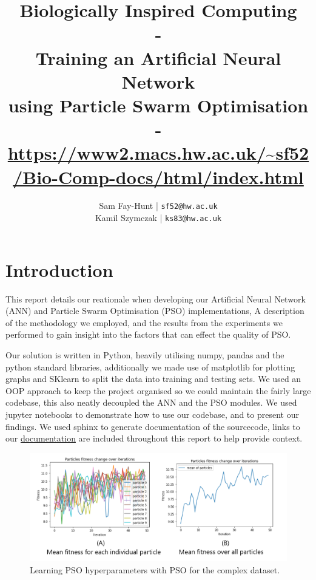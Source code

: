 \documentclass[11pt]{article}
\begin{document}
\title{%
	\bf Biologically Inspired Computing\\ 
    \large - \\
    Training an Artificial Neural Network\\
     using Particle Swarm Optimisation\\
     -\\
     \url{https://www2.macs.hw.ac.uk/~sf52/Bio-Comp-docs/html/index.html}}

\author{
	Sam Fay-Hunt | \texttt{sf52@hw.ac.uk}\\
	Kamil Szymczak | \texttt{ks83@hw.ac.uk}
}

\maketitle
\thispagestyle{empty}
\pagebreak

\tableofcontents
\thispagestyle{empty}
\pagebreak


\setcounter{page}{1}

\section{Introduction}
This report details our reationale when developing our Artificial Neural Network (ANN) and Particle Swarm Optimisation (PSO) implementations, A description of the methodology we employed, and the results from the experiments we performed to gain insight into the factors that can effect the quality of PSO.

Our solution is written in Python, heavily utilising numpy, pandas and the python standard libraries, additionally we made use of matplotlib for plotting graphs and SKlearn to split the data into training and testing sets.
We used an OOP approach to keep the project organised so we could maintain the fairly large codebase, this also neatly decoupled the ANN and the PSO modules.
We used jupyter notebooks to demonstrate how to use our codebase, and to present our findings.
We used sphinx to generate documentation of the sourcecode, links to our \href{https://www2.macs.hw.ac.uk/~sf52/Bio-Comp-docs/html/index.html}{documentation} are included throughout this report to help provide context.

\begin{figure}[H]
    \begin{center}
        \includegraphics[width=1\textwidth]{comples_pso_combined.png} 
    \end{center}
    
    \caption{Learning PSO hyperparameters with PSO for the complex dataset.}
    \label{fig:complexpsolearning}   
\end{figure}
\end{document}
